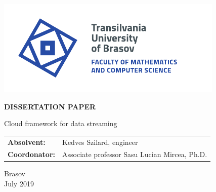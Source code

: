 \begin{titlepage}
	
	\vspace*{-3cm}
	\hspace{-2cm}
	\includegraphics[width=0.8\linewidth]{./images/Logo-UT-MI-SPOT-EN}
	
	\begin{center}
		\Huge
		
		\vspace{2cm}
		
		\textbf{DISSERTATION PAPER}
		
		\vspace{1cm}
		
		\LARGE
		Cloud framework for data streaming
		
		\vfill
		
		\Large
		\begin{tabular}{ll}
			\textbf{Absolvent:}&Kedves Szilard, engineer\\
			\textbf{Coordonator:}&Associate professor Sasu Lucian Mircea, Ph.D.
		\end{tabular}
		
		\vfill
		
		\Large
		Brașov\\
		July 2019
		
	\end{center}
\end{titlepage}